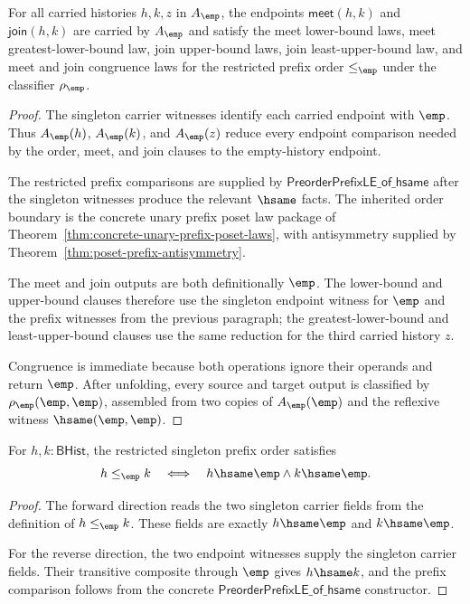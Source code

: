 \begin{theorem}
\label{thm:concrete-singleton-prefix-lattice-laws}
For all carried histories $h,k,z$ in $A_{\emp}$, the endpoints
$\mathsf{meet}(h,k)$ and $\mathsf{join}(h,k)$ are carried by $A_{\emp}$ and
satisfy the meet lower-bound laws, meet greatest-lower-bound law, join
upper-bound laws, join least-upper-bound law, and meet and join congruence laws
for the restricted prefix order $\le_{\emp}$ under the classifier
$\rho_{\emp}$.
\end{theorem}
\begin{proof}
The singleton carrier witnesses identify each carried endpoint with $\emp$.
Thus $A_{\emp}(h)$, $A_{\emp}(k)$, and $A_{\emp}(z)$ reduce every endpoint
comparison needed by the order, meet, and join clauses to the empty-history
endpoint.

The restricted prefix comparisons are supplied by
$\mathsf{PreorderPrefixLE\_of\_hsame}$ after the singleton witnesses produce
the relevant $\hsame$ facts. The inherited order boundary is the concrete unary
prefix poset law package of Theorem~\ref{thm:concrete-unary-prefix-poset-laws},
with antisymmetry supplied by Theorem~\ref{thm:poset-prefix-antisymmetry}.

The meet and join outputs are both definitionally $\emp$. The lower-bound and
upper-bound clauses therefore use the singleton endpoint witness for $\emp$
and the prefix witnesses from the previous paragraph; the greatest-lower-bound
and least-upper-bound clauses use the same reduction for the third carried
history $z$.

Congruence is immediate because both operations ignore their operands and
return $\emp$. After unfolding, every source and target output is classified by
$\rho_{\emp}(\emp,\emp)$, assembled from two copies of $A_{\emp}(\emp)$ and the
reflexive witness $\hsame(\emp,\emp)$.
\end{proof}

\begin{theorem}
\label{thm:lattice-singleton-le-empty-endpoints}
For $h,k:\mathsf{BHist}$, the restricted singleton prefix order satisfies
$$
h\le_{\emp} k
\quad\Longleftrightarrow\quad
h\hsame\emp\land k\hsame\emp.
$$
\end{theorem}
\begin{proof}
The forward direction reads the two singleton carrier fields from the
definition of $h\le_{\emp} k$. These fields are exactly $h\hsame\emp$ and
$k\hsame\emp$.

For the reverse direction, the two endpoint witnesses supply the singleton
carrier fields. Their transitive composite through $\emp$ gives $h\hsame k$,
and the prefix comparison follows from the concrete
$\mathsf{PreorderPrefixLE\_of\_hsame}$ constructor.
\end{proof}

